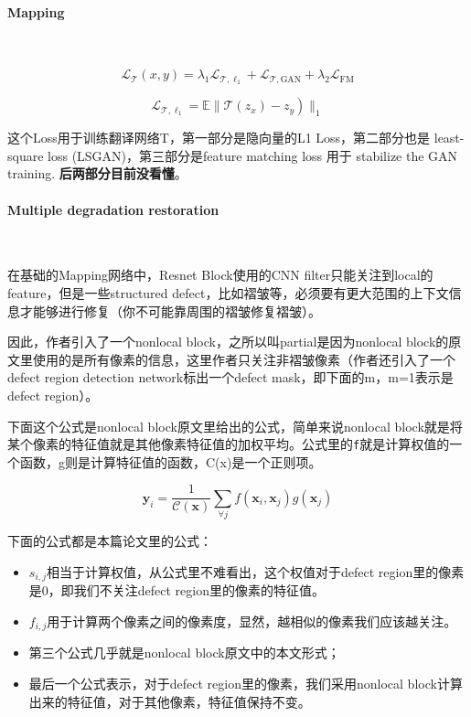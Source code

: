 \documentclass[10pt]{article}
\begin{document}
\paragraph{Mapping}~{}
\newline

\[\mathcal{L}_{\mathcal{T}}(x, y)=\lambda_{1} \mathcal{L}_{\mathcal{T}, \ell_{1}}+\mathcal{L}_{\mathcal{T}, \mathrm{GAN}}+\lambda_{2} \mathcal{L}_{\mathrm{FM}}\]

\[\left.\mathcal{L}_{\mathcal{T}, \ell_{1}}=\mathbb{E} \| \mathcal{T}\left(z_{x}\right)-z_{y}\right) \|_{1}\]

这个Loss用于训练翻译网络T，第一部分是隐向量的L1 Loss，第二部分也是
least-square loss (LSGAN)，第三部分是feature matching loss 用于
stabilize the GAN training. \textbf{后两部分目前没看懂}。

\paragraph{Multiple degradation restoration}~{}
\newline

在基础的Mapping网络中，Resnet Block使用的CNN
filter只能关注到local的feature，但是一些structured
defect，比如褶皱等，必须要有更大范围的上下文信息才能够进行修复（你不可能靠周围的褶皱修复褶皱）。

因此，作者引入了一个nonlocal block，之所以叫partial是因为nonlocal
block的原文里使用的是所有像素的信息，这里作者只关注非褶皱像素（作者还引入了一个defect
region detection network标出一个defect mask，即下面的m，m=1表示是defect
region）。

下面这个公式是nonlocal block原文里给出的公式，简单来说nonlocal
block就是将某个像素的特征值就是其他像素特征值的加权平均。公式里的\texttt{f}就是计算权值的一个函数，g则是计算特征值的函数，C(x)是一个正则项。

\[\mathbf{y}_{i}=\frac{1}{\mathcal{C}(\mathbf{x})} \sum_{\forall j} f\left(\mathbf{x}_{i}, \mathbf{x}_{j}\right) g\left(\mathbf{x}_{j}\right)\]

下面的公式都是本篇论文里的公式：

\begin{itemize}
\item
  \(s_{i,j}\)相当于计算权值，从公式里不难看出，这个权值对于defect
  region里的像素是0，即我们不关注defect region里的像素的特征值。
\item
  \(f_{i,j}\)用于计算两个像素之间的像素度，显然，越相似的像素我们应该越关注。
\item
  第三个公式几乎就是nonlocal block原文中的本文形式；
\item
  最后一个公式表示，对于defect region里的像素，我们采用nonlocal
  block计算出来的特征值，对于其他像素，特征值保持不变。
\end{itemize}
\end{document}
